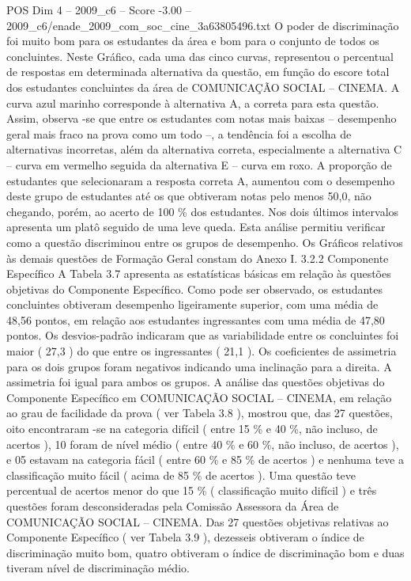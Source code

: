 \begin{textsample}{POS Dim 4 – 2009\_c6 – Score -3.00 – 2009\_c6/enade\_2009\_com\_soc\_cine\_3a63805496.txt}
O poder de discriminação foi muito bom para os estudantes da área e bom para o conjunto de todos os concluintes.
Neste Gráfico, cada uma das cinco curvas, representou o percentual de respostas em determinada alternativa da questão, em função do escore total dos estudantes concluintes da área de COMUNICAÇÃO SOCIAL – CINEMA.
A curva azul marinho corresponde à alternativa A, a correta para esta questão.
Assim, observa -se que entre os estudantes com notas mais baixas – desempenho geral mais fraco na prova como um todo –, a tendência foi a escolha de alternativas incorretas, além da alternativa correta, especialmente a alternativa C – curva em vermelho seguida da alternativa E – curva em roxo.
A proporção de estudantes que selecionaram a resposta correta A, aumentou com o desempenho deste grupo de estudantes até os que obtiveram notas pelo menos 50,0, não chegando, porém, ao acerto de 100 \% dos estudantes.
Nos dois últimos intervalos apresenta um platô seguido de uma leve queda.
Esta análise permitiu verificar como a questão discriminou entre os grupos de desempenho.
Os Gráficos relativos às demais questões de Formação Geral constam do Anexo I. 3.2.2 Componente Específico A Tabela 3.7 apresenta as estatísticas básicas em relação às questões objetivas do Componente Específico.
Como pode ser observado, os estudantes concluintes obtiveram desempenho ligeiramente superior, com uma média de 48,56 pontos, em relação aos estudantes ingressantes com uma média de 47,80 pontos.
Os desvios-padrão indicaram que as variabilidade entre os concluintes foi maior ( 27,3 ) do que entre os ingressantes ( 21,1 ).
Os coeficientes de assimetria para os dois grupos foram negativos indicando uma inclinação para a direita.
A assimetria foi igual para ambos os grupos.
A análise das questões objetivas do Componente Específico em COMUNICAÇÃO SOCIAL – CINEMA, em relação ao grau de facilidade da prova ( ver Tabela 3.8 ), mostrou que, das 27 questões, oito encontraram -se na categoria difícil ( entre 15 \% e 40 \%, não incluso, de acertos ), 10 foram de nível médio ( entre 40 \% e 60 \%, não incluso, de acertos ), e 05 estavam na categoria fácil ( entre 60 \% e 85 \% de acertos ) e nenhuma teve a classificação muito fácil ( acima de 85 \% de acertos ).
Uma questão teve percentual de acertos menor do que 15 \% ( classificação muito difícil ) e três questões foram desconsideradas pela Comissão Assessora da Área de COMUNICAÇÃO SOCIAL – CINEMA.
Das 27 questões objetivas relativas ao Componente Específico ( ver Tabela 3.9 ), dezesseis obtiveram o índice de discriminação muito bom, quatro obtiveram o índice de discriminação bom e duas tiveram nível de discriminação médio.

\end{textsample}
